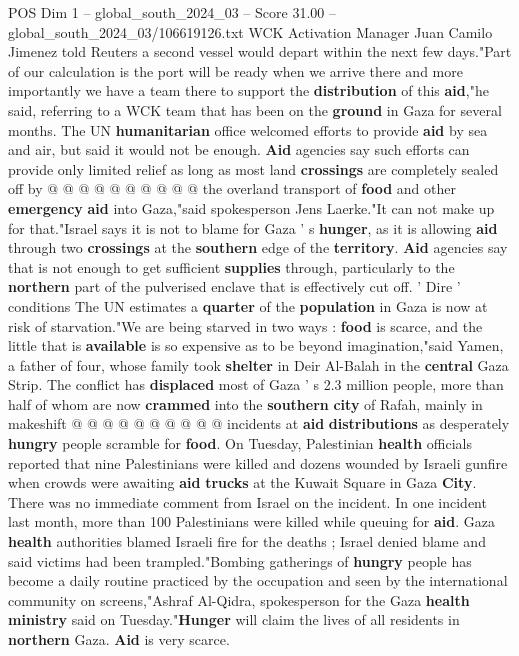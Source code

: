 \begin{textsample}{POS Dim 1 – global\_south\_2024\_03 – Score 31.00 – global\_south\_2024\_03/106619126.txt}
WCK Activation Manager Juan Camilo Jimenez told Reuters a second vessel would depart within the next few days."Part of our calculation is the port will be ready when we arrive there and more importantly we have a team there to support the \textbf{distribution} of this \textbf{aid},"he said, referring to a WCK team that has been on the \textbf{ground} in Gaza for several months.
The UN \textbf{humanitarian} office welcomed efforts to provide \textbf{aid} by sea and air, but said it would not be enough. \textbf{Aid} agencies say such efforts can provide only limited relief as long as most land \textbf{crossings} are completely sealed off by @ @ @ @ @ @ @ @ @ @ the overland transport of \textbf{food} and other \textbf{emergency} \textbf{aid} into Gaza,"said spokesperson Jens Laerke."It can not make up for that."Israel says it is not to blame for Gaza ' s \textbf{hunger}, as it is allowing \textbf{aid} through two \textbf{crossings} at the \textbf{southern} edge of the \textbf{territory}. \textbf{Aid} agencies say that is not enough to get sufficient \textbf{supplies} through, particularly to the \textbf{northern} part of the pulverised enclave that is effectively cut off. ' Dire ' conditions The UN estimates a \textbf{quarter} of the \textbf{population} in Gaza is now at risk of starvation."We are being starved in two ways : \textbf{food} is scarce, and the little that is \textbf{available} is so expensive as to be beyond imagination,"said Yamen, a father of four, whose family took \textbf{shelter} in Deir Al-Balah in the \textbf{central} Gaza Strip.
The conflict has \textbf{displaced} most of Gaza ' s 2.3 million people, more than half of whom are now \textbf{crammed} into the \textbf{southern} \textbf{city} of Rafah, mainly in makeshift @ @ @ @ @ @ @ @ @ @ incidents at \textbf{aid} \textbf{distributions} as desperately \textbf{hungry} people scramble for \textbf{food}.
On Tuesday, Palestinian \textbf{health} officials reported that nine Palestinians were killed and dozens wounded by Israeli gunfire when crowds were awaiting \textbf{aid} \textbf{trucks} at the Kuwait Square in Gaza \textbf{City}.
There was no immediate comment from Israel on the incident.
In one incident last month, more than 100 Palestinians were killed while queuing for \textbf{aid}.
Gaza \textbf{health} authorities blamed Israeli fire for the deaths ; Israel denied blame and said victims had been trampled."Bombing gatherings of \textbf{hungry} people has become a daily routine practiced by the occupation and seen by the international community on screens,"Ashraf Al-Qidra, spokesperson for the Gaza \textbf{health} \textbf{ministry} said on Tuesday."\textbf{Hunger} will claim the lives of all residents in \textbf{northern} Gaza. \textbf{Aid} is very scarce.

\end{textsample}
